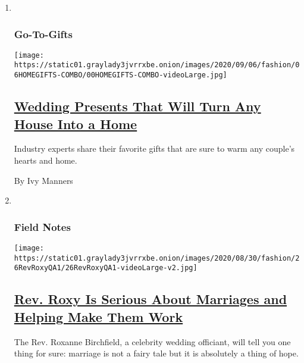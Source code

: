 \begin{enumerate}
\def\labelenumi{\arabic{enumi}.}
\item ~
  \hypertarget{go-to-gifts}{%
  \subsubsection{Go-To-Gifts}\label{go-to-gifts}}

  \texttt{[image: https://static01.graylady3jvrrxbe.onion/images/2020/09/06/fashion/06HOMEGIFTS-COMBO/00HOMEGIFTS-COMBO-videoLarge.jpg]}

  \hypertarget{wedding-presents-that-will-turn-any-house-into-a-home}{%
  \subsection{\texorpdfstring{\href{/2020/08/29/fashion/weddings/wedding-presents-that-will-turn-any-house-into-a-home.html}{Wedding
  Presents That Will Turn Any House Into a
  Home}}{Wedding Presents That Will Turn Any House Into a Home}}\label{wedding-presents-that-will-turn-any-house-into-a-home}}

  Industry experts share their favorite gifts that are sure to warm any
  couple's hearts and home.

  By Ivy Manners
\item ~
  \hypertarget{field-notes}{%
  \subsubsection{Field Notes}\label{field-notes}}

  \texttt{[image: https://static01.graylady3jvrrxbe.onion/images/2020/08/30/fashion/26RevRoxyQA1/26RevRoxyQA1-videoLarge-v2.jpg]}

  \hypertarget{rev-roxy-is-serious-about-marriages-and-helping-make-them-work}{%
  \subsection{\texorpdfstring{\href{/2020/08/27/fashion/weddings/rev-roxy-is-serious-about-marriages-and-helping-make-them-work.html}{Rev.
  Roxy Is Serious About Marriages and Helping Make Them
  Work}}{Rev. Roxy Is Serious About Marriages and Helping Make Them Work}}\label{rev-roxy-is-serious-about-marriages-and-helping-make-them-work}}

  The Rev. Roxanne Birchfield, a celebrity wedding officiant, will tell
  you one thing for sure: marriage is not a fairy tale but it is
  absolutely a thing of hope.


\end{enumerate}
